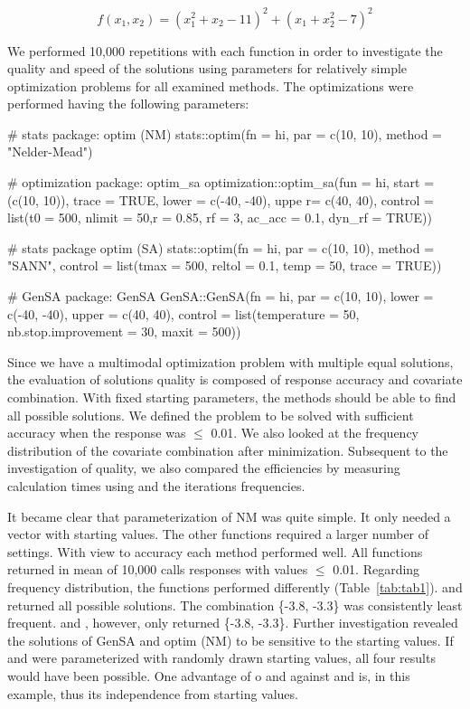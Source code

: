 \begin{equation}
\label{eq:eq2}
f(x_1,x_2)=(x_1^2+x_2-11)^2+(x_1+x_2^2-7)^2
\end{equation}

We performed 10,000 repetitions with each function in order to investigate the quality and speed of the solutions using parameters for relatively simple optimization problems for all examined methods. The optimizations were performed having the following parameters:
    
    \begin{example}
# stats package: optim (NM)
stats::optim(fn = hi, par = c(10, 10), method = "Nelder-Mead")

# optimization package: optim_sa
optimization::optim_sa(fun = hi, start = (c(10, 10)), trace = TRUE, 
                       lower = c(-40, -40), uppe r= c(40, 40),
                       control = list(t0 = 500, nlimit = 50,r = 0.85,
                                      rf = 3, ac_acc = 0.1, dyn_rf = TRUE))

# stats package optim (SA)
stats::optim(fn = hi, par = c(10, 10), method = "SANN",
             control = list(tmax = 500, reltol = 0.1, temp = 50, trace = TRUE))

# GenSA package: GenSA
GenSA::GenSA(fn = hi, par = c(10, 10), lower = c(-40, -40), upper = c(40, 40), 
             control = list(temperature = 50, nb.stop.improvement = 30, maxit = 500))
\end{example}
Since we have a multimodal optimization problem with multiple equal solutions, the evaluation of solutions quality is composed of response accuracy and covariate combination. With fixed starting parameters, the methods should be able to find all possible solutions.  We  defined the problem to  be solved with sufficient accuracy when the response was $\leq$ 0.01. We also looked at the frequency distribution of the covariate combination after minimization. Subsequent to the investigation of quality, we also compared the efficiencies by measuring calculation times using  and the iterations frequencies.

It became clear that parameterization of NM was quite simple. It only needed a vector with starting values. The other functions required a larger number of settings. With view to accuracy each method performed well. All functions returned in mean of 10,000 calls responses with values $\leq$ 0.01. Regarding frequency distribution, the functions performed differently (Table~\ref{tab:tab1}).  and  returned all possible solutions. The combination \{-3.8, -3.3\} was consistently least frequent.  and , however, only returned \{-3.8, -3.3\}. Further investigation revealed the solutions of GenSA and optim (NM) to be sensitive to the starting values. If  and  were parameterized with randomly drawn starting values, all four results would have been possible. One advantage of o and  against  and  is, in this example, thus its independence from starting values.

